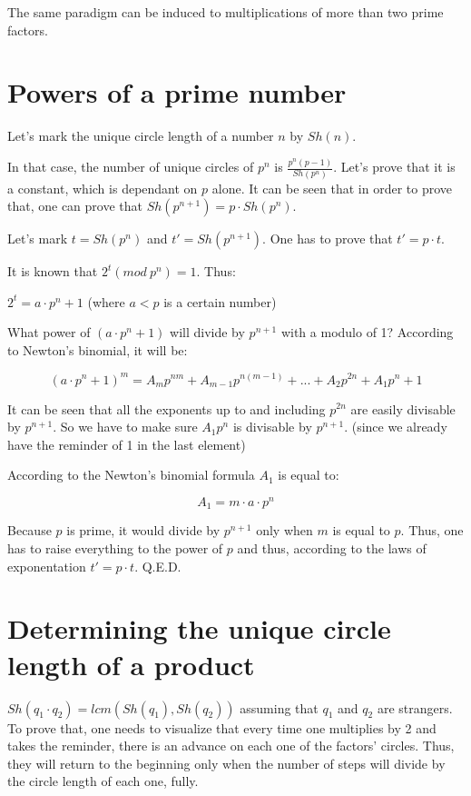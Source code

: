 \documentclass[a4paper]{report}
\begin{document}
The same paradigm can be induced to multiplications of more than two prime
factors.

\section{Powers of a prime number}

Let's mark the unique circle length of a number $ n $ by $ Sh(n) $.

In that case, the number of unique circles of $ p^{n} $ is 
$ \frac{p^{n}(p-1)}{Sh(p^{n})} $. Let's prove that it is a constant, which 
is dependant on $ p $ alone. It can be seen that in order to prove that,
one can prove that $ Sh(p^{n+1}) = p \cdot Sh(p^{n}) $.

Let's mark $ t = Sh(p^{n}) $ and $ t'=Sh(p^{n+1}) $. One has to prove that
$ t' = p \cdot t $.

It is known that $ 2^{t} (mod ~ p^{n}) = 1 $. Thus:

$ 2^{t} = a \cdot p^{n} + 1 $ (where $ a < p $ is a certain number)

What power of $ (a \cdot p^{n} + 1 ) $ will divide by $ p^{n+1} $ with
a modulo of 1? According to Newton's binomial, it will be:

\[
(a \cdot p^{n} + 1)^{m} = A_{m}p^{nm} + A_{m-1}p^{n(m-1)} + ... + A_{2}p^{2n} + A_{1}p^{n} + 1
\]

It can be seen that all the exponents up to and including $ p^{2n} $ are easily
divisable by $ p^{n+1} $. So we have to make sure $ A_{1}p^{n} $ is divisable
by $ p^{n+1} $. (since we already have the reminder of 1 in the last element)

According to the Newton's binomial formula $ A_{1} $ is equal to:

\[
A_{1} = m \cdot a \cdot p^{n}
\]

Because $ p $ is prime, it would divide by $ p^{n+1} $ only when $ m $ is equal
to $ p $. Thus, one has to raise everything to the power of $ p $ and thus, 
according to the laws of exponentation $ t'=p \cdot t $. Q.E.D.

\section{Determining the unique circle length of a product}

$ Sh(q_{1} \cdot q_{2}) = lcm(Sh(q_{1}), Sh(q_{2})) $ assuming
that $ q_{1} $ and $ q_{2} $ are strangers. To prove that, one needs
to visualize that every time one multiplies by 2 and takes the reminder, there
is an advance on each one of the factors' circles. Thus, they will return
to the beginning only when the number of steps will divide by the circle
length of each one, fully.
\end{document}
